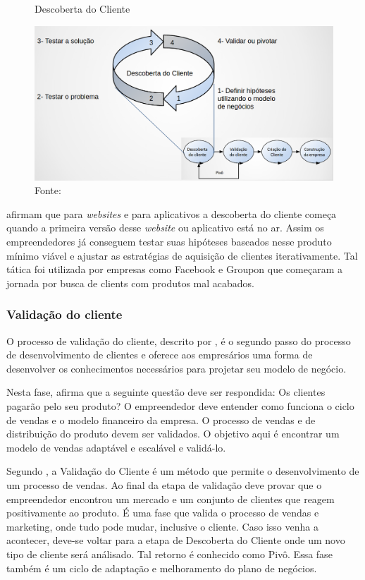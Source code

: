 \begin{figure}[H]
\caption{Descoberta do Cliente}
\centerline{\includegraphics[scale=0.5]{img/descoberta_do_cliente}}
\label{fig:descoberta_do_cliente}
\caption* {Fonte: }
\end{figure}

 afirmam que para \textit{websites} e para aplicativos a descoberta do cliente começa quando a primeira versão desse \textit{website} ou aplicativo está no ar. Assim os empreendedores já conseguem testar suas hipóteses baseados nesse produto mínimo viável e ajustar as estratégias de aquisição de clientes iterativamente. Tal tática foi utilizada por empresas como Facebook e Groupon que começaram a jornada por busca de clients com produtos mal acabados.

\subsubsection{Validação do cliente}
\label{cha:validacao_do_cliente}
O processo de validação do cliente, descrito por , é o segundo passo do processo de desenvolvimento de clientes e oferece aos empresários uma forma de desenvolver os conhecimentos necessários para projetar seu modelo de negócio. 

Nesta fase,  afirma que a seguinte questão deve ser respondida: Os clientes pagarão pelo seu produto? O empreendedor deve entender como funciona o ciclo de vendas e o modelo financeiro da empresa. O processo de vendas e de distribuição do produto devem ser validados. O objetivo aqui é encontrar um modelo de vendas adaptável e escalável e validá-lo. 

Segundo , a Validação do Cliente é um método que permite o desenvolvimento de um processo de vendas. Ao final da etapa de validação deve provar que o empreendedor encontrou um mercado e um conjunto de clientes que reagem positivamente ao produto. É uma fase que valida o processo de vendas e marketing, onde tudo pode mudar, inclusive o cliente. Caso isso venha a acontecer, deve-se voltar para a etapa de Descoberta do Cliente onde um novo tipo de cliente será análisado. Tal retorno é conhecido como Pivô. Essa fase também é um ciclo de adaptação e melhoramento do plano de negócios.

